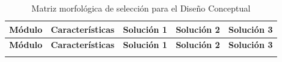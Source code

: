 \begin{longtable}{@{}|p{2cm}|p{2.5cm}|p{2.5cm}|p{2.5cm}|p{2.5cm}|}
	\caption{Matriz morfológica de selección para el Diseño Conceptual}
	\textbf{Módulo} & \textbf{Características} & \textbf{Solución 1} & \textbf{Solución 2} & \textbf{Solución 3} \\
	\hline \hline
	\endfirsthead
	
	\hline
	\textbf{Módulo} & \textbf{Características} & \textbf{Solución 1} & \textbf{Solución 2} & \textbf{Solución 3} \\
	\hline \hline
	\endhead
	
	\multicolumn{5}{c}{}
	\endfoot
	
	\endlastfoot
	

\end{longtable}
